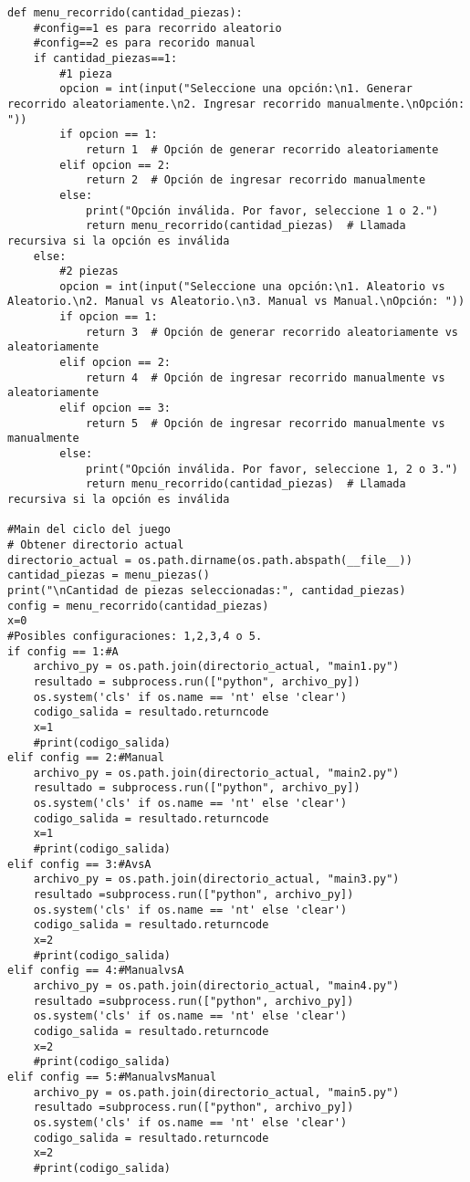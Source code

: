 \begin{enumerate}
\begin{lstlisting}
def menu_recorrido(cantidad_piezas):
    #config==1 es para recorrido aleatorio
    #config==2 es para recorido manual
    if cantidad_piezas==1:
        #1 pieza
        opcion = int(input("Seleccione una opción:\n1. Generar recorrido aleatoriamente.\n2. Ingresar recorrido manualmente.\nOpción: "))
        if opcion == 1:
            return 1  # Opción de generar recorrido aleatoriamente
        elif opcion == 2:
            return 2  # Opción de ingresar recorrido manualmente
        else:
            print("Opción inválida. Por favor, seleccione 1 o 2.")
            return menu_recorrido(cantidad_piezas)  # Llamada recursiva si la opción es inválida
    else:
        #2 piezas
        opcion = int(input("Seleccione una opción:\n1. Aleatorio vs Aleatorio.\n2. Manual vs Aleatorio.\n3. Manual vs Manual.\nOpción: "))
        if opcion == 1:
            return 3  # Opción de generar recorrido aleatoriamente vs aleatoriamente
        elif opcion == 2:
            return 4  # Opción de ingresar recorrido manualmente vs aleatoriamente
        elif opcion == 3:
            return 5  # Opción de ingresar recorrido manualmente vs manualmente
        else:
            print("Opción inválida. Por favor, seleccione 1, 2 o 3.")
            return menu_recorrido(cantidad_piezas)  # Llamada recursiva si la opción es inválida
    
#Main del ciclo del juego
# Obtener directorio actual
directorio_actual = os.path.dirname(os.path.abspath(__file__))
cantidad_piezas = menu_piezas()
print("\nCantidad de piezas seleccionadas:", cantidad_piezas)
config = menu_recorrido(cantidad_piezas)
x=0
#Posibles configuraciones: 1,2,3,4 o 5.
if config == 1:#A
    archivo_py = os.path.join(directorio_actual, "main1.py")
    resultado = subprocess.run(["python", archivo_py])
    os.system('cls' if os.name == 'nt' else 'clear')
    codigo_salida = resultado.returncode
    x=1
    #print(codigo_salida)
elif config == 2:#Manual
    archivo_py = os.path.join(directorio_actual, "main2.py")
    resultado = subprocess.run(["python", archivo_py])
    os.system('cls' if os.name == 'nt' else 'clear')
    codigo_salida = resultado.returncode
    x=1
    #print(codigo_salida)
elif config == 3:#AvsA
    archivo_py = os.path.join(directorio_actual, "main3.py")
    resultado =subprocess.run(["python", archivo_py])
    os.system('cls' if os.name == 'nt' else 'clear')
    codigo_salida = resultado.returncode
    x=2
    #print(codigo_salida)
elif config == 4:#ManualvsA
    archivo_py = os.path.join(directorio_actual, "main4.py")
    resultado =subprocess.run(["python", archivo_py])
    os.system('cls' if os.name == 'nt' else 'clear')
    codigo_salida = resultado.returncode
    x=2
    #print(codigo_salida)
elif config == 5:#ManualvsManual
    archivo_py = os.path.join(directorio_actual, "main5.py")
    resultado =subprocess.run(["python", archivo_py])
    os.system('cls' if os.name == 'nt' else 'clear')
    codigo_salida = resultado.returncode
    x=2
    #print(codigo_salida)


\end{lstlisting}
\end{enumerate}
